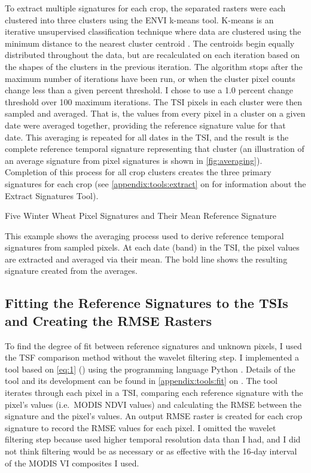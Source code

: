 To extract multiple signatures for each crop, the separated rasters were each clustered into three clusters using the ENVI \autocite{envi5.0} k-means tool. K-means is an iterative unsupervised classification technique where data are clustered using the minimum distance to the nearest cluster centroid \autocites{kmeans2014}{matteucciclustering:}. The centroids begin equally distributed throughout the data, but are recalculated on each iteration based on the shapes of the clusters in the previous iteration. The algorithm stops after the maximum number of iterations have been run, or when the cluster pixel counts change less than a given percent threshold. I chose to use a 1.0 percent change threshold over 100 maximum iterations. The TSI pixels in each cluster were then sampled and averaged. That is, the values from every pixel in a cluster on a given date were averaged together, providing the reference signature value for that date. This averaging is repeated for all dates in the TSI, and the result is the complete reference temporal signature representing that cluster (an illustration of an average signature from pixel signatures is shown in \autoref{fig:averaging}). Completion of this process for all crop clusters creates the three primary signatures for each crop (see \autoref{appendix:tools:extract} on  for information about the Extract Signatures Tool).

\begin{ssfigure}
  \centering
  
  \caption{Five Winter Wheat Pixel Signatures and Their Mean Reference Signature}
  \label{fig:averaging}
  \medskip
  \small
  This example shows the averaging process used to derive reference temporal signatures from sampled pixels. At each date (band) in the TSI, the pixel values are extracted and averaged via their mean. The bold line shows the resulting signature created from the averages.
\end{ssfigure}


\subsection{Fitting the Reference Signatures to the TSIs and Creating the RMSE Rasters}

To find the degree of fit between reference signatures and unknown pixels, I used the TSF comparison method without the wavelet filtering step. I implemented a tool based on \autoref{eq:1} () using the programming language Python \autocite{python2.7.8}. Details of the tool and its development can be found in \autoref{appendix:tools:fit} on . The tool iterates through each pixel in a TSI, comparing each reference signature with the pixel's values (i.e.\ MODIS NDVI values) and calculating the RMSE between the signature and the pixel's values. An output RMSE raster is created for each crop signature to record the RMSE values for each pixel. I omitted the wavelet filtering step because \citeauthor{sakamoto2010a-two-step} used higher temporal resolution data than I had, and I did not think filtering would be as necessary or as effective with the 16-day interval of the MODIS VI composites I used.

